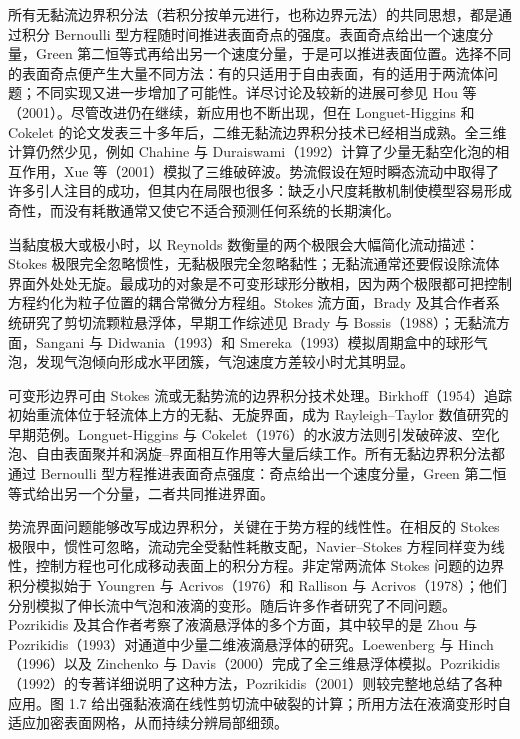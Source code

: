 \documentclass[11pt,a4paper,openany,fontset=none]{ctexbook}
\newenvironment{sourceblock}
  {\par\addvspace{0.65\baselineskip}\noindent\begin{minipage}{\linewidth}\centering}
  {\end{minipage}\par\addvspace{0.48\baselineskip}}
\begin{document}
所有无黏流边界积分法（若积分按单元进行，也称边界元法）的共同思想，都是通过积分 Bernoulli 型方程随时间推进表面奇点的强度。表面奇点给出一个速度分量，Green 第二恒等式再给出另一个速度分量，于是可以推进表面位置。选择不同的表面奇点便产生大量不同方法：有的只适用于自由表面，有的适用于两流体问题；不同实现又进一步增加了可能性。详尽讨论及较新的进展可参见 Hou 等（2001）。尽管改进仍在继续，新应用也不断出现，但在 Longuet-Higgins 和 Cokelet 的论文发表三十多年后，二维无黏流边界积分技术已经相当成熟。全三维计算仍然少见，例如 Chahine 与 Duraiswami（1992）计算了少量无黏空化泡的相互作用，Xue 等（2001）模拟了三维破碎波。势流假设在短时瞬态流动中取得了许多引人注目的成功，但其内在局限也很多：缺乏小尺度耗散机制使模型容易形成奇性，而没有耗散通常又使它不适合预测任何系统的长期演化。

当黏度极大或极小时，以 Reynolds 数衡量的两个极限会大幅简化流动描述：Stokes 极限完全忽略惯性，无黏极限完全忽略黏性；无黏流通常还要假设除流体界面外处处无旋。最成功的对象是不可变形球形分散相，因为两个极限都可把控制方程约化为粒子位置的耦合常微分方程组。Stokes 流方面，Brady 及其合作者系统研究了剪切流颗粒悬浮体，早期工作综述见 Brady 与 Bossis（1988）；无黏流方面，Sangani 与 Didwania（1993）和 Smereka（1993）模拟周期盒中的球形气泡，发现气泡倾向形成水平团簇，气泡速度方差较小时尤其明显。

可变形边界可由 Stokes 流或无黏势流的边界积分技术处理。Birkhoff（1954）追踪初始重流体位于轻流体上方的无黏、无旋界面，成为 Rayleigh--Taylor 数值研究的早期范例。Longuet-Higgins 与 Cokelet（1976）的水波方法则引发破碎波、空化泡、自由表面聚并和涡旋--界面相互作用等大量后续工作。所有无黏边界积分法都通过 Bernoulli 型方程推进表面奇点强度：奇点给出一个速度分量，Green 第二恒等式给出另一个分量，二者共同推进界面。

\begin{sourceblock}
\end{sourceblock}

势流界面问题能够改写成边界积分，关键在于势方程的线性性。在相反的 Stokes 极限中，惯性可忽略，流动完全受黏性耗散支配，Navier--Stokes 方程同样变为线性，控制方程也可化成移动表面上的积分方程。非定常两流体 Stokes 问题的边界积分模拟始于 Youngren 与 Acrivos（1976）和 Rallison 与 Acrivos（1978）；他们分别模拟了伸长流中气泡和液滴的变形。随后许多作者研究了不同问题。Pozrikidis 及其合作者考察了液滴悬浮体的多个方面，其中较早的是 Zhou 与 Pozrikidis（1993）对通道中少量二维液滴悬浮体的研究。Loewenberg 与 Hinch（1996）以及 Zinchenko 与 Davis（2000）完成了全三维悬浮体模拟。Pozrikidis（1992）的专著详细说明了这种方法，Pozrikidis（2001）则较完整地总结了各种应用。图 1.7 给出强黏液滴在线性剪切流中破裂的计算；所用方法在液滴变形时自适应加密表面网格，从而持续分辨局部细颈。
\end{document}

